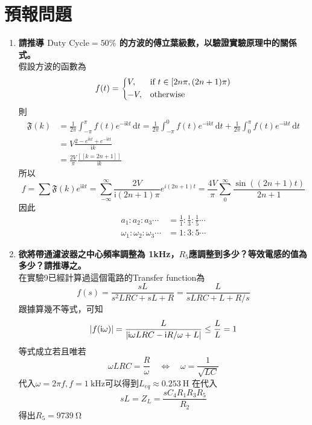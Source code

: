 \documentclass[12pt, a4paper]{article}
\def\large{\fontsize{14}{21}\selectfont}
\DeclarePairedDelimiter{\abs}{\lvert}{\rvert}
\newcommand{\img}{\mathsf{i}}
\newcommand{\dI}{\,\mathrm{d}}
\begin{document}
\section{預報問題}

\begin{enumerate}[itemsep=20pt, topsep=10pt]
  \item {\large\bf 請推導 $\text{Duty Cycle} =50\%$ 的方波的傅立葉級數，以驗證實驗原理中的關係式。} \\[10pt]
    假設方波的函數為
    \[
      f(t) = 
      \begin{dcases}
        V, & \text{if } t \in [2n\pi, (2n+1)\pi) \\
        -V, & \text{otherwise}
      \end{dcases}
    \]
    則
    \begin{align*}
      \mathfrak{F}(k) &= \frac{1}{2\pi} \int_{-\pi}^{\pi} f(t) e^{- \img k t} \dI t  = \frac{1}{2\pi} \int_{-\pi}^{0} f(t) e^{- \img k t} \dI t +  \frac{1}{2\pi} \int_{0}^{\pi} f(t) e^{- \img k t} \dI t  \\
                      &= V \frac{2 - e^{\img k t} + e^{- \img k t}}{\img k}  \\
      & = \frac{2V}{\pi} \frac{ [[ k = 2n + 1 ]] }{\img k}  
    \end{align*}
    所以
    \[
      f = \sum \mathfrak{F}(k) e^{\img k t} = \sum_{-\infty}^{\infty} \frac{2V}{\img (2n+1) \pi} e^{i(2n+1)t} = \frac{4V}{\pi} \sum_{0}^{\infty} \frac{\sin ((2n+1) t)}{2n+1}
    \]
    因此
    \begin{align*}
      a_1:a_2:a_3 \cdots &= \frac{1}{1} : \frac{1}{3} : \frac{1}{5}   \cdots \\
      \omega_1:\omega_2:\omega_3 \cdots &= 1:3:5 \cdots
    \end{align*}
  \item {\large\bf 欲將帶通濾波器之中心頻率調整為 1kHz，$R_5$應調整到多少？等效電感的值為多少？請推導之。}  \\[10pt]
    在實驗9已經計算過這個電路的Transfer function為
    \[
      f(s) = \frac{sL}{s^2LRC + sL + R} = \frac{L}{sLRC + L + R/s} 
    \]
    跟據算幾不等式，可知
    \[
      \abs*{f(\img \omega)} = \frac{L}{\abs{\img \omega LRC - \img R/\omega+L}} \leq \frac{L}{L} = 1
    \]
    等式成立若且唯若
    \[
      \omega LRC = \frac{R}{\omega} \quad \Leftrightarrow \quad \omega = \frac{1}{\sqrt{LC}}
    \]
    代入$\omega = 2 \pi f, f = \SI{1}{\kHz} $可以得到$L_{eq} \approx \SI{0.253}{\henry}$ 
    在代入
    \[
      sL = Z_L = \frac{s C_4 R_1 R_3 R_5}{R_2} 
    \]
    得出$R_5 = \SI{9739}{\ohm} $

\end{enumerate}
\end{document}
